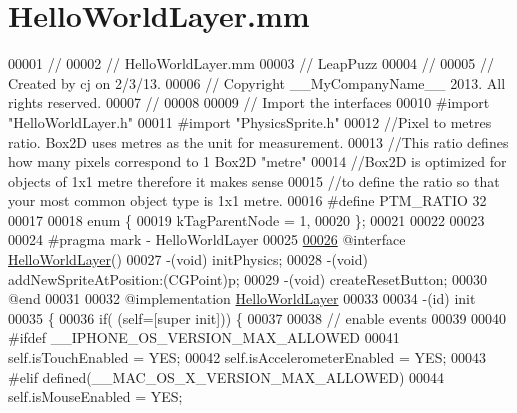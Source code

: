 \hypertarget{_hello_world_layer_8mm}{\section{Hello\-World\-Layer.\-mm}
\label{d6/d17/_hello_world_layer_8mm}
}

\begin{DoxyCode}
00001 \textcolor{comment}{//}
00002 \textcolor{comment}{//  HelloWorldLayer.mm}
00003 \textcolor{comment}{//  LeapPuzz}
00004 \textcolor{comment}{//}
00005 \textcolor{comment}{//  Created by cj on 2/3/13.}
00006 \textcolor{comment}{//  Copyright \_\_MyCompanyName\_\_ 2013. All rights reserved.}
00007 \textcolor{comment}{//}
00008 
00009 \textcolor{comment}{// Import the interfaces}
00010 \textcolor{preprocessor}{#import "HelloWorldLayer.h"}
00011 \textcolor{preprocessor}{#import "PhysicsSprite.h"}
00012 \textcolor{comment}{//Pixel to metres ratio. Box2D uses metres as the unit for measurement.}
00013 \textcolor{comment}{//This ratio defines how many pixels correspond to 1 Box2D "metre"}
00014 \textcolor{comment}{//Box2D is optimized for objects of 1x1 metre therefore it makes sense}
00015 \textcolor{comment}{//to define the ratio so that your most common object type is 1x1 metre.}
00016 \textcolor{preprocessor}{#define PTM\_RATIO 32}
00017 \textcolor{preprocessor}{}
00018 \textcolor{keyword}{enum} \{
00019     kTagParentNode = 1,
00020 \};
00021 
00022 
00023 
00024 \textcolor{preprocessor}{#pragma mark - HelloWorldLayer}
00025 \textcolor{preprocessor}{}
\hypertarget{_hello_world_layer_8mm_source_l00026}{}\hyperlink{category_hello_world_layer_07_08}{00026} \textcolor{keyword}{@interface }\hyperlink{interface_hello_world_layer}{HelloWorldLayer}()
00027 -(void) initPhysics;
00028 -(void) addNewSpriteAtPosition:(CGPoint)p;
00029 -(void) createResetButton;
00030 \textcolor{keyword}{@end}
00031 
00032 \textcolor{keyword}{@implementation }\hyperlink{interface_hello_world_layer}{HelloWorldLayer}
00033 
00034 -(id) init
00035 \{
00036     \textcolor{keywordflow}{if}( (\textcolor{keyword}{self}=[super init])) \{
00037         
00038         \textcolor{comment}{// enable events}
00039         
00040 \textcolor{preprocessor}{#ifdef \_\_IPHONE\_OS\_VERSION\_MAX\_ALLOWED}
00041 \textcolor{preprocessor}{}        \textcolor{keyword}{self}.isTouchEnabled = YES;
00042         \textcolor{keyword}{self}.isAccelerometerEnabled = YES;
00043 \textcolor{preprocessor}{#elif defined(\_\_MAC\_OS\_X\_VERSION\_MAX\_ALLOWED)}
00044 \textcolor{preprocessor}{}        \textcolor{keyword}{self}.isMouseEnabled = YES;

\end{DoxyCode}
